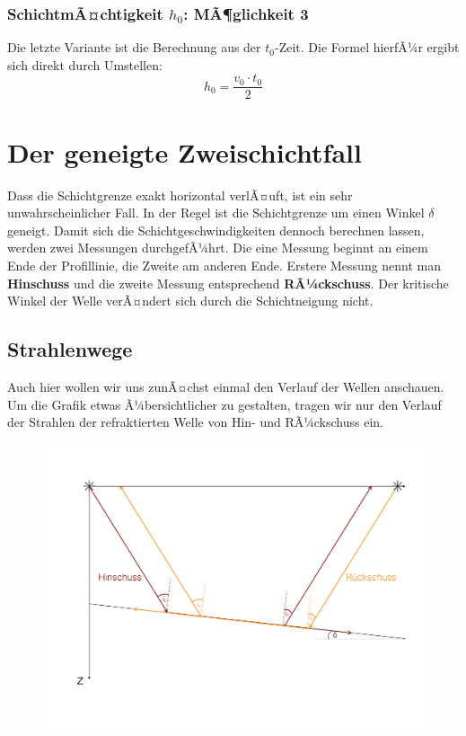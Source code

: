 \subsubsection{SchichtmÃ¤chtigkeit $h_0$: MÃ¶glichkeit 3}
Die letzte Variante ist die Berechnung aus der $t_0$-Zeit. Die Formel hierfÃ¼r ergibt sich direkt durch Umstellen: \begin{equation*}
	h_0 = \frac{v_0 \cdot t_0}{2}
\end{equation*}



\section{Der geneigte Zweischichtfall}
Dass die Schichtgrenze exakt horizontal verlÃ¤uft, ist ein sehr unwahrscheinlicher Fall. In der Regel ist die Schichtgrenze um einen Winkel $\delta$ geneigt. Damit sich die Schichtgeschwindigkeiten dennoch berechnen lassen, werden zwei Messungen durchgefÃ¼hrt. Die eine Messung beginnt an einem Ende der Profillinie, die Zweite am anderen Ende. Erstere Messung nennt man \textbf{Hinschuss} und die zweite Messung entsprechend \textbf{RÃ¼ckschuss}. Der kritische Winkel der Welle verÃ¤ndert sich durch die Schichtneigung nicht.

\subsection{Strahlenwege}
Auch hier wollen wir uns zunÃ¤chst einmal den Verlauf der Wellen anschauen. Um die Grafik etwas Ã¼bersichtlicher zu gestalten, tragen wir nur den Verlauf der Strahlen der refraktierten Welle von Hin- und RÃ¼ckschuss ein.

\begin{figure}[H]
	\centering
	\includegraphics[width = \textwidth]{RefraktionsseismikBilder/geneigteSchichtStrahlen}
\end{figure}


